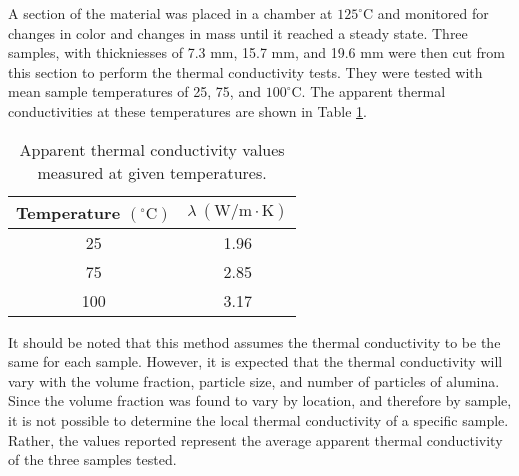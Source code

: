 A section of the material was placed in a chamber at \(125^{\circ}\mathrm{C}\) and monitored for changes in color and changes in mass until it reached a steady state.  Three samples, with thickniesses of 7.3 mm, 15.7 mm, and 19.6 mm were then cut from this section to perform the thermal conductivity tests.  They were tested with mean sample temperatures of 25, 75, and \(100^{\circ}\mathrm{C}\).  The apparent thermal conductivities at these temperatures are shown in Table \ref{tab:ApparentThermalConductivity}.
\begin{table}[htbp]
 \centering
\caption{Apparent thermal conductivity values measured at given temperatures.}
\begin{tabular}{cc}
\toprule
Temperature \( (^{\circ}\mathrm{C})\) & \(\lambda\:\mathrm{(W/m\cdot K)}\) \\
\midrule
25 & 1.96 \\
75 & 2.85\\
100 & 3.17\\
\bottomrule
\end{tabular}
\label{tab:ApparentThermalConductivity}
\end{table}

It should be noted that this method assumes the thermal conductivity to be the same for each sample.  However, it is expected that the thermal conductivity will vary with the volume fraction, particle size, and number of particles of alumina.  Since the volume fraction was found to vary by location, and therefore by sample, it is not possible to determine the local thermal conductivity of a specific sample.  Rather, the values reported represent the average apparent thermal conductivity of the three samples tested.  


